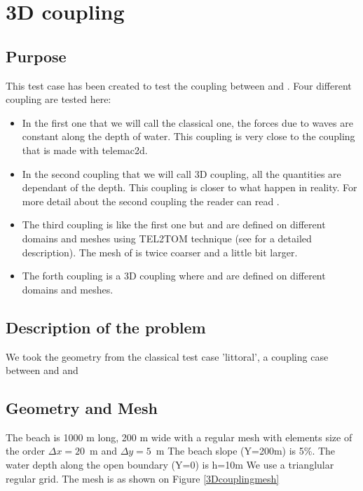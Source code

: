 \chapter{3D coupling}
%
%
\section{Purpose}
%
This test case has been created to test the coupling between \tomawac and
. Four different coupling are tested here:
\begin{itemize}
\item In the first one that we will call the classical one, the forces due to
  waves are constant along the depth of water. This coupling is very close to
  the coupling that is made with telemac2d.
\item In the second coupling that we will call 3D coupling, all the
quantities are dependant of the depth. This coupling is closer to what
happen in reality. For more detail about the second coupling the reader can
read \cite{Teles2013}.
\item The third coupling is like the first one but \tomawac and  are
  defined on different domains and meshes using TEL2TOM technique
  (see \cite{breugem2019} for a detailed description). The mesh of \tomawac is twice coarser and a little bit larger. 
\item The forth coupling is a 3D coupling where \tomawac and  are
  defined on different domains and meshes.
\end{itemize}
%
\section{Description of the problem}
We took the geometry from the classical test case 'littoral', a coupling case
between \tomawac and  and \gaia
\section{Geometry and Mesh}
%
The beach is 1000 m long, 200 m wide with a regular mesh with
elements size of the order $\Delta x=20$~m and $\Delta y=5$~m
 The beach slope (Y=200m) is 5\%.
 The water depth along the open boundary (Y=0) is h=10m
We use a trianglular regular grid.  
The mesh is as shown on Figure \ref{3Dcouplingmesh}


